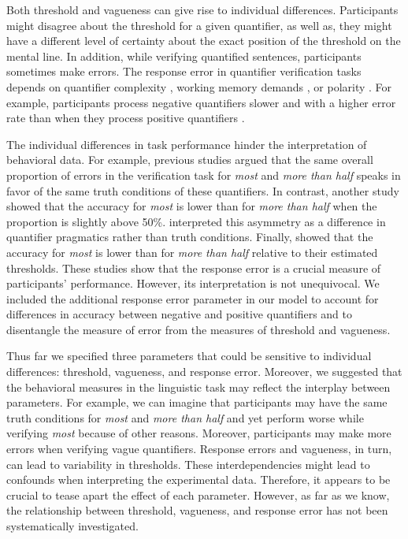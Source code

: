 \documentclass{article}
\begin{document}
Both threshold and vagueness can give rise to individual differences. Participants might disagree about the threshold for a given quantifier, as well as, they might have a different level of certainty about the exact position of the threshold on the mental line. In addition, while verifying quantified sentences, participants sometimes make errors. The response error in quantifier verification tasks depends on quantifier complexity \cite{Zajenkowski2013MOSTPerspective}, working memory demands \cite{Zajenkowski2013MOSTPerspective}, or polarity \cite{Zajenkowski2013MOSTPerspective, Deschamps2015ThePerception.}. For example, participants process negative quantifiers slower and with a higher error rate than when they process positive quantifiers \cite{Just1971ComprehensionQuantification, Deschamps2015ThePerception., Schlotterbeck2020RepresentationalEffect}.

The individual differences in task performance hinder the interpretation of behavioral data. For example, previous studies \cite{Hackl2009} argued that the same overall proportion of errors in the verification task for \textit{most} and \textit{more than half} speaks in favor of the same truth conditions of these quantifiers. In contrast, another study \cite{Kotek2015} showed that the accuracy for \textit{most} is lower than for \textit{more than half} when the proportion is slightly above 50\%.  interpreted this asymmetry as a difference in quantifier pragmatics rather than truth conditions. Finally,  showed that the accuracy for \textit{most} is lower than for \textit{more than half} relative to their estimated thresholds. These studies show that the response error is a crucial measure of participants' performance. However, its interpretation is not unequivocal. We included the additional response error parameter in our model to account for differences in accuracy between negative and positive quantifiers and to disentangle the measure of error from the measures of threshold and vagueness. 

Thus far we specified three parameters that could be sensitive to individual differences: threshold, vagueness, and response error. Moreover, we suggested that the behavioral measures in the linguistic task may reflect the interplay between parameters. For example, we can imagine that participants may have the same truth conditions for \textit{most} and \textit{more than half} and yet perform worse while verifying \textit{most} because of other reasons. Moreover, participants may make more errors when verifying vague quantifiers. Response errors and vagueness, in turn, can lead to variability in thresholds. These interdependencies might lead to confounds when interpreting the experimental data. Therefore, it appears to be crucial to tease apart the effect of each parameter. However, as far as we know, the relationship between threshold, vagueness, and response error has not been systematically investigated.
\end{document}
